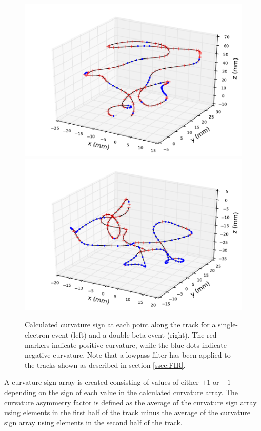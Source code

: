 \documentclass{JINST}
\begin{document}
\begin{figure}[!htb]
	\includegraphics[scale=0.48]{fig/plt_trkcurv_nmagse2_6.pdf}
	\includegraphics[scale=0.48]{fig/plt_trkcurv_nmagbb2_2.pdf}
	\caption{\label{fig_trkcurv}Calculated curvature sign at each point along the track for a single-electron event (left) and a double-beta event (right).  The red $+$ markers indicate positive curvature, while the blue dots indicate negative
	curvature.  Note that a lowpass filter has been applied to the tracks shown as described in section \protect\ref{ssec:FIR}.}
\end{figure}

A curvature sign array is created consisting of values of either $+1$ or $-1$ depending on the sign of each value in the calculated curvature array.  The curvature asymmetry factor is defined as the average of the curvature sign array using elements in the first half of the track minus the average of the curvature sign array using elements in the second half of the track.
\end{document}
